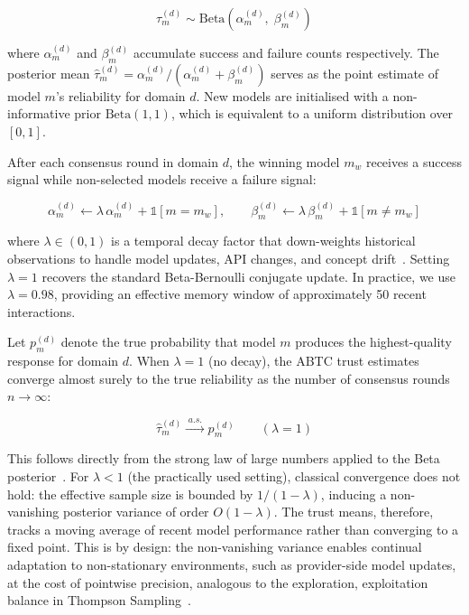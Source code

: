 \documentclass{iopjournal}
\begin{document}
\begin{equation}
\tau_m^{(d)} \sim \text{Beta}(\alpha_m^{(d)},\; \beta_m^{(d)})
\label{eq:trust_prior}
\end{equation}

\noindent where $\alpha_m^{(d)}$ and $\beta_m^{(d)}$ accumulate success and failure counts respectively. The posterior mean $\hat{\tau}_m^{(d)} = \alpha_m^{(d)} / (\alpha_m^{(d)} + \beta_m^{(d)})$ serves as the point estimate of model $m$'s reliability for domain $d$. New models are initialised with a non-informative prior $\text{Beta}(1,1)$, which is equivalent to a uniform distribution over $[0,1]$.

After each consensus round in domain $d$, the winning model $m_w$ receives a success signal while non-selected models receive a failure signal:

\begin{equation}
\alpha_{m}^{(d)} \leftarrow \lambda\,\alpha_{m}^{(d)} + \mathbb{1}[m = m_w], \qquad
\beta_{m}^{(d)}  \leftarrow \lambda\,\beta_{m}^{(d)}  + \mathbb{1}[m \neq m_w]
\label{eq:update}
\end{equation}

\noindent where $\lambda \in (0,1)$ is a temporal decay factor that down-weights historical observations to handle model updates, API changes, and concept drift~\cite{ThompsonSampling}. Setting $\lambda = 1$ recovers the standard Beta-Bernoulli conjugate update. In practice, we use $\lambda = 0.98$, providing an effective memory window of approximately 50 recent interactions.

Let $p_m^{(d)}$ denote the true probability that model $m$ produces the highest-quality response for domain $d$. When $\lambda = 1$ (no decay), the ABTC trust estimates converge almost surely to the true reliability as the number of consensus rounds $n \to \infty$:

\begin{equation}
\hat{\tau}_m^{(d)} \xrightarrow{\;a.s.\;} p_m^{(d)} \qquad (\lambda = 1)
\label{eq:convergence}
\end{equation}

\noindent This follows directly from the strong law of large numbers applied to the Beta posterior~\cite{BetaBernoulli}. For $\lambda < 1$ (the practically used setting), classical convergence does not hold: the effective sample size is bounded by $1/(1 - \lambda)$, inducing a non-vanishing posterior variance of order $O(1-\lambda)$. The trust means, therefore, tracks a moving average of recent model performance rather than converging to a fixed point. This is by design: the non-vanishing variance enables continual adaptation to non-stationary environments, such as provider-side model updates, at the cost of pointwise precision, analogous to the exploration, exploitation balance in Thompson Sampling~\cite{ThompsonSampling}.
\end{document}
